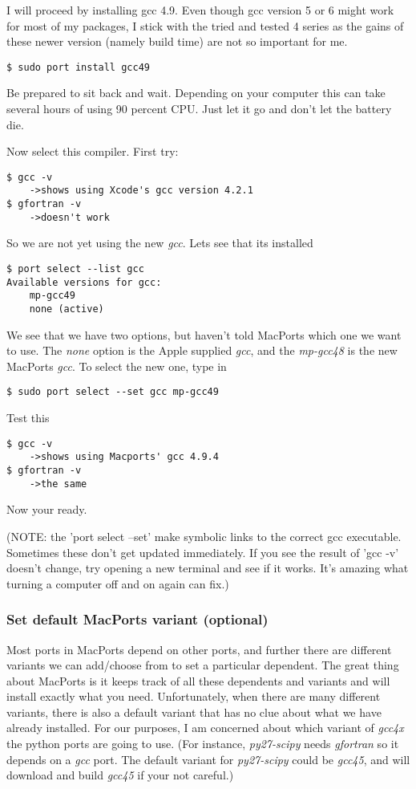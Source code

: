 \documentclass[11pt, A4paper]{article}
\begin{document}
I will proceed by installing gcc 4.9. Even though gcc version 5 or 6 might work for most of my packages, I stick with the tried and tested 4 series as the gains of these newer version (namely build time) are not so important for me.
\begin{lstlisting}[style=Bash]
$ sudo port install gcc49
\end{lstlisting}
Be prepared to sit back and wait. Depending on your computer this can take several hours of using 90 percent CPU. Just let it go and don't let the battery die.

Now select this compiler. First try:
\begin{lstlisting}[style=Bash]
$ gcc -v
    ->shows using Xcode's gcc version 4.2.1
$ gfortran -v 
    ->doesn't work
\end{lstlisting}
So we are not yet using the new \textit{gcc}. Lets see that its installed
\begin{lstlisting}[style=Bash]
$ port select --list gcc
Available versions for gcc:
	mp-gcc49
	none (active)
\end{lstlisting}
We see that we have two options, but haven't told MacPorts which one we want to use. The \textit{none} option is the Apple supplied \textit{gcc}, and the \textit{mp-gcc48} is the new MacPorts \textit{gcc}. To select the new one, type in
\begin{lstlisting}[style=Bash]
$ sudo port select --set gcc mp-gcc49
\end{lstlisting}
Test this
\begin{lstlisting}[style=Bash]
$ gcc -v
    ->shows using Macports' gcc 4.9.4
$ gfortran -v
    ->the same
\end{lstlisting}
Now your ready. 

(NOTE: the 'port select --set' make symbolic links to the correct gcc executable. Sometimes these don't get updated immediately. If you see the result of 'gcc -v' doesn't change, try opening a new terminal and see if it works. It's amazing what turning a computer off and on again can fix.)


\subsubsection{Set default MacPorts variant (optional)}
Most ports in MacPorts depend on other ports, and further there are different variants we can add/choose from to set a particular dependent. The great thing about MacPorts is it keeps track of all these dependents and variants and will install exactly what you need. Unfortunately, when there are many different variants, there is also a default variant that has no clue about what we have already installed. For our purposes, I am concerned about which variant of \textit{gcc4x} the python ports are going to use. (For instance, \textit{py27-scipy} needs \textit{gfortran} so it depends on a \textit{gcc} port. The default variant for \textit{py27-scipy} could be \textit{gcc45}, and will download and build \textit{gcc45} if your not careful.)
\end{document}
